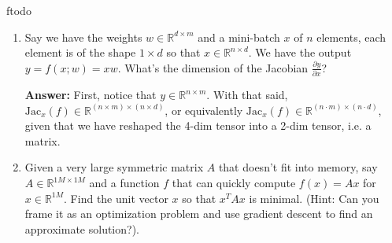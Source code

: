ƒtodo\documentclass{article}
\newenvironment{QandA}{\begin{enumerate}[label=\arabic*.]}{\end{enumerate}}
\newenvironment{answer}{\par\normalfont \textbf{Answer:}}{}
\newcommand{\R}{\mathbb{R}}
\newcommand{\Jac}{\text{Jac}}
\begin{document}
\begin{QandA}
    \item Say we have the weights $w \in \R^{d \times m}$ and a mini-batch $x$ of $n$ elements, each element is of the shape $1 \times d$ so that $x \in \R^{n \times d}$. We have the output $y = f(x; w) = xw$. What's the dimension of the Jacobian $\frac{\partial y}{\partial x}$?
    \begin{answer}
        First, notice that $y \in \R^{n \times m}$. With that said, $\Jac_x(f) \in \R^{(n \times m) \times (n \times d)}$, or equivalently $\Jac_x(f) \in \R^{(n \cdot m) \times (n \cdot d)}$, given that we have reshaped the 4-dim tensor into a 2-dim tensor, i.e. a matrix.
    \end{answer}
    
    \item Given a very large symmetric matrix $A$ that doesn't fit into memory, say $A \in \R^{1M \times 1M}$ and a function $f$ that can quickly compute $f(x) = Ax$ for $x \in \R^{1M}$. Find the unit vector $x$ so that $x^T A x$ is minimal. (Hint: Can you frame it as an optimization problem and use gradient descent to find an approximate solution?).
    

\end{QandA}
\end{document}
